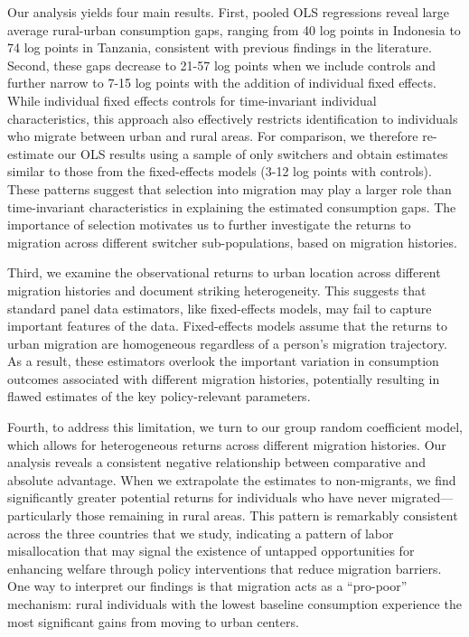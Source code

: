 \documentclass[12pt]{article}
\begin{document}
Our analysis yields four main results. 
First, pooled OLS regressions reveal large average rural-urban consumption gaps, ranging from 40 log points in Indonesia to 74 log points in Tanzania, consistent with previous findings in the literature.
Second, these gaps decrease to 21-57 log points when we include controls and further narrow to 7-15 log points with the addition of individual fixed effects. 
While individual fixed effects controls for time-invariant individual characteristics, this approach also effectively restricts identification to individuals who migrate between urban and rural areas.
For comparison, we therefore re-estimate our OLS results using a sample of only switchers and obtain estimates similar to those from the fixed-effects models (3-12 log points with controls).
These patterns suggest that selection into migration may play a larger role than time-invariant characteristics in explaining the estimated consumption gaps.
The importance of selection motivates us to further investigate the returns to migration across different switcher sub-populations, based on migration histories.

Third, we examine the observational returns to urban location across different migration histories and document striking heterogeneity. 
This suggests that standard panel data estimators, like fixed-effects models, may fail to capture important features of the data.
Fixed-effects models assume that the returns to urban migration are homogeneous regardless of a person's migration trajectory.
As a result, these estimators overlook the important variation in consumption outcomes associated with different migration histories, potentially resulting in flawed estimates of the key policy-relevant parameters. 

Fourth, to address this limitation, we turn to our group random coefficient model, which allows for heterogeneous returns across different migration histories. 
Our analysis reveals a consistent negative relationship between comparative and absolute advantage.
When we extrapolate the estimates to non-migrants, we find significantly greater potential returns for individuals who have never migrated---particularly those remaining in rural areas. 
This pattern is remarkably consistent across the three countries that we study, indicating a pattern of labor misallocation that may signal the existence of untapped opportunities for enhancing welfare through policy interventions that reduce migration barriers.
One way to interpret our findings is that migration acts as a ``pro-poor'' mechanism: rural individuals with the lowest baseline consumption experience the most significant gains from moving to urban centers. 
\end{document}
